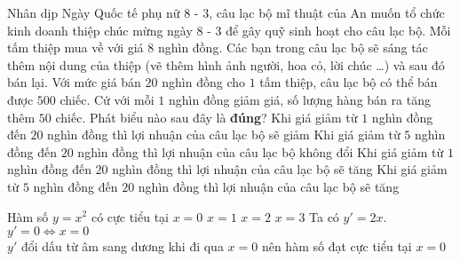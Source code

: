 \begin{ex}%
	Nhân dịp Ngày Quốc tế phụ nữ $8$ - $3$, câu lạc bộ mĩ thuật của An muốn tổ chức kinh doanh thiệp chúc mừng ngày $8$ - $3$ để gây quỹ sinh hoạt cho câu lạc bộ. Mỗi tấm thiệp mua về với giá $8$ nghìn đồng. Các bạn trong câu lạc bộ sẽ sáng tác thêm nội dung của thiệp (vẽ thêm hình ảnh người, hoa cỏ, lời chúc \ldots) và sau đó bán lại. Với mức giá bán $20$ nghìn đồng cho $1$ tấm thiệp, câu lạc bộ có thể bán được $500$ chiếc. Cứ với mỗi $1$ nghìn đồng giảm giá, số lượng hàng bán ra tăng thêm $50$ chiếc. Phát biểu nào sau đây là \textbf{đúng}?
	\choice
	{\True Khi giá giảm từ $1$ nghìn đồng đến $20$ nghìn đồng thì lợi nhuận của câu lạc bộ sẽ giảm}
	{Khi giá giảm từ $5$ nghìn đồng đến $20$ nghìn đồng thì lợi nhuận của câu lạc bộ không đổi}
	{Khi giá giảm từ $1$ nghìn đồng đến $20$ nghìn đồng thì lợi nhuận của câu lạc bộ sẽ tăng}
	{Khi giá giảm từ $5$ nghìn đồng đến $20$ nghìn đồng thì lợi nhuận của câu lạc bộ sẽ tăng}
\end{ex}

\begin{ex}%
	Hàm số $y=x^2$ có cực tiểu tại
	\choice
	{\True $x=0$}
	{$x=1$}
	{$x=2$}
	{$x=3$}
	\loigiai
	{
		Ta có $y'=2x$.\\
		$y'=0\Leftrightarrow x=0$\\
		$y'$ đổi dấu từ âm sang dương khi đi qua $x=0$ nên hàm số đạt cực tiểu tại $x=0$
	}
\end{ex}

